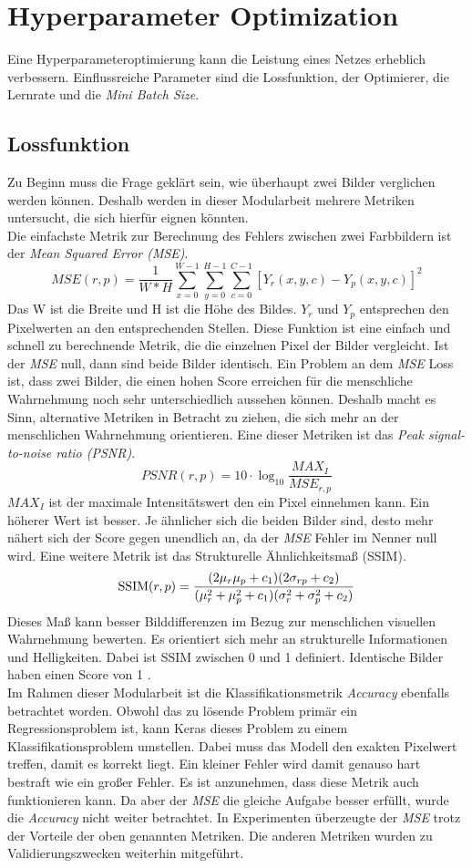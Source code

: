 \documentclass[conference]{IEEEtran}
\begin{document}
\section{Hyperparameter Optimization}
Eine Hyperparameteroptimierung kann die Leistung eines Netzes erheblich verbessern. Einflussreiche Parameter sind die Lossfunktion, der Optimierer, die Lernrate und die \textit{Mini Batch Size}.
\subsection{Lossfunktion}
Zu Beginn muss die Frage geklärt sein, wie überhaupt zwei Bilder verglichen werden können. Deshalb werden in dieser Modularbeit mehrere Metriken untersucht, die sich hierfür eignen könnten.\\
Die einfachste Metrik zur Berechnung des Fehlers zwischen zwei Farbbildern ist der \textit{Mean Squared Error (MSE)}.
\[ MSE(r,p) = \frac{1}{W*H} \sum_{x=0}^{W-1} \sum_{y=0}^{H-1} \sum_{c=0}^{C-1}[Y_r(x,y,c)-Y_p(x,y,c)]^2 \]
Das W ist die Breite und H ist die Höhe des Bildes. $Y_r$ und $Y_p$ entsprechen den Pixelwerten an den entsprechenden Stellen.
Diese Funktion ist eine einfach und schnell zu berechnende Metrik, die die einzelnen Pixel der Bilder vergleicht. Ist der \textit{MSE} null, dann sind beide Bilder identisch.
Ein Problem an dem \textit{MSE} Loss ist, dass zwei Bilder, die einen hohen Score erreichen für die menschliche Wahrnehmung noch sehr unterschiedlich aussehen können.
Deshalb macht es Sinn, alternative Metriken in Betracht zu ziehen, die sich mehr an der menschlichen Wahrnehmung orientieren. Eine dieser Metriken ist das \textit{Peak signal-to-noise ratio (PSNR)}.
\[ \mathit{PSNR(r,p)}=10\cdot \log_{10}\frac{\mathit{MAX}_{I}}{\mathit{MSE}_{r,p}} \]
$\mathit{MAX}_{I}$ ist der maximale Intensitätswert den ein Pixel einnehmen kann. Ein höherer Wert ist besser. Je ähnlicher sich die beiden Bilder sind, desto mehr nähert sich der Score gegen unendlich an, da der \textit{MSE} Fehler im Nenner null wird\cite{PSNR}. Eine weitere Metrik ist das Strukturelle Ähnlichkeitsmaß (SSIM).
\[ \hbox{SSIM}(r,p)={\frac {(2\mu _{r}\mu _{p}+c_{1})(2\sigma _{rp}+c_{2})}{(\mu _{r}^{2}+\mu _{p}^{2}+c_{1})(\sigma _{r}^{2}+\sigma _{p}^{2}+c_{2})}} \]
Dieses Maß kann besser Bilddifferenzen im Bezug zur menschlichen visuellen Wahrnehmung bewerten. Es orientiert sich mehr an strukturelle Informationen und Helligkeiten. Dabei ist SSIM zwischen 0 und 1 definiert. Identische Bilder haben einen Score von 1 \cite{4}.\\
Im Rahmen dieser Modularbeit ist die Klassifikationsmetrik \textit{Accuracy} ebenfalls betrachtet worden. Obwohl das zu lösende Problem primär ein Regressionsproblem ist, kann Keras dieses Problem zu einem Klassifikationsproblem umstellen. Dabei muss das Modell den exakten Pixelwert treffen, damit es korrekt liegt. Ein kleiner Fehler wird damit genauso hart bestraft wie ein großer Fehler. Es ist anzunehmen, dass diese Metrik auch funktionieren kann. Da aber der \textit{MSE} die gleiche Aufgabe besser erfüllt, wurde die \textit{Accuracy} nicht weiter betrachtet. In Experimenten überzeugte der \textit{MSE} trotz der Vorteile der oben genannten Metriken. Die anderen Metriken wurden zu Validierungszwecken weiterhin mitgeführt.
\end{document}

